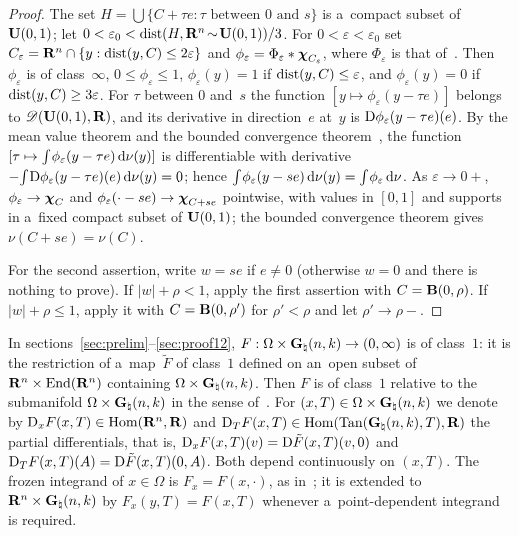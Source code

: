 \documentclass[a4paper,twoside,leqno]{article}
\newcommand{\Gk}{\pgrass{\adim}{\vdim}}        %
\newcommand{\MS}{\textbf{[MS path]}}            %
\begin{document}
\begin{proof}
    The set $H = \bigcup \{ C + \tau e : \tau \text{ between $0$ and $s$} \}$ is a~compact subset
    of~$\mathbf{U}(0,1)$; let $0 < \varepsilon_0 < \operatorname{dist}(H, \mathbf{R}^{n} \!\sim\! \mathbf{U}(0,1))/3$. For
    $0 < \varepsilon < \varepsilon_0$ set $C_\varepsilon = \mathbf{R}^{n} \cap \{ y : \operatorname{dist}(y,C) \le
    2\varepsilon \}$ and $\phi_\varepsilon = \Phi_\varepsilon * \boldsymbol{\chi}_{C_\varepsilon}$, where
    $\Phi_\varepsilon$ is that of~\cite[4.1.2]{Federer1969}. Then $\phi_\varepsilon$ is of
    class~$\infty$, $0 \le \phi_\varepsilon \le 1$, $\phi_\varepsilon(y) = 1$ if $\operatorname{dist}(y,C) \le
    \varepsilon$, and $\phi_\varepsilon(y) = 0$ if $\operatorname{dist}(y,C) \ge 3 \varepsilon$. For $\tau$
    between $0$ and~$s$ the function $[ y \mapsto \phi_\varepsilon(y - \tau e) ]$ belongs to
    $\mathscr{D}(\mathbf{U}(0,1),\mathbf{R})$, and its derivative in direction~$e$ at~$y$ is $\mathrm{D}
    \phi_\varepsilon(y - \tau e)(e)$. By the mean value theorem and the bounded convergence
    theorem~\cite[2.4.9]{Federer1969}, the function $[ \tau \mapsto {\textstyle\int_{}^{}} \phi_\varepsilon(y
    - \tau e) \,\mathrm{d} \nu(y) ]$ is differentiable with derivative $- {\textstyle\int_{}^{}} \mathrm{D}
    \phi_\varepsilon(y - \tau e)(e) \,\mathrm{d} \nu(y) = 0$; hence ${\textstyle\int_{}^{}} \phi_\varepsilon(y - se)
    \,\mathrm{d} \nu(y) = {\textstyle\int_{}^{}} \phi_\varepsilon \,\mathrm{d} \nu$. As $\varepsilon \to 0+$,
    $\phi_\varepsilon \to \boldsymbol{\chi}_{C}$ and $\phi_\varepsilon(\cdot - se) \to \boldsymbol{\chi}_{C + se}$ pointwise,
    with values in $[0,1]$ and supports in a~fixed compact subset of $\mathbf{U}(0,1)$; the bounded
    convergence theorem gives $\nu(C + se) = \nu(C)$.

    For the second assertion, write $w = se$ if $e \ne 0$ (otherwise $w = 0$ and there is nothing
    to prove). If $|w| + \rho < 1$, apply the first assertion with $C = \mathbf{B}(0,\rho)$. If $|w| +
    \rho \le 1$, apply it with $C = \mathbf{B}(0,\rho')$ for $\rho' < \rho$ and let $\rho' \to \rho-$.
\end{proof}

\begin{miniremark}[\MS]
    \label{mr:integrands}
    In sections~\ref{sec:prelim}--\ref{sec:proof12}, $F : \Omega \times \Gk \to (0,\infty)$ is of
    class~$1$: it is the restriction of a~map~$\tilde F$ of class~$1$ defined on an~open subset
    of $\mathbf{R}^{n} \times \mathrm{End}({\mathbf{R}^{n}})$ containing $\Omega \times \Gk$. Then $F$ is of
    class~$1$ relative to the submanifold $\Omega \times \Gk$ in the sense
    of~\cite[3.1.22]{Federer1969}. For $(x,T) \in \Omega \times \Gk$ we denote by $\mathrm{D}_x F(x,T)
    \in \operatorname{Hom}(\mathbf{R}^{n},\mathbf{R})$ and $\uD_T F(x,T) \in \Hom(\Tan(\Gk,T),\R)$ the partial
    differentials, that is, $\mathrm{D}_x F(x,T)(v) = \mathrm{D} \tilde F(x,T)(v,0)$ and $\mathrm{D}_T F(x,T)(A) = \mathrm{D}
    \tilde F(x,T)(0,A)$. Both depend continuously on $(x,T)$. The frozen integrand of $x \in
    \Omega$ is $F_x = F(x,\cdot)$, as in~\cite[(2.7)]{DePhilippis2018}; it is extended to $\R^{\adim}
    \times \Gk$ by $F_x(y,T) = F(x,T)$ whenever a~point-dependent integrand is required.
\end{miniremark}
\end{document}
